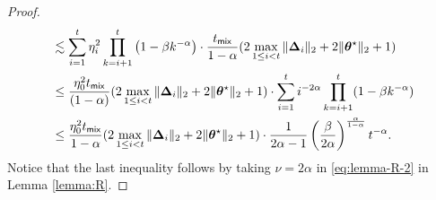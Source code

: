 \begin{proof}
\begin{align}
&\lesssim \sum_{i=1}^t \eta_i^2 \prod_{k=i+1}^t \left(1-\beta k^{-\alpha} \right) \cdot  \frac{t_{\mathsf{mix}}}{1-\alpha} (2\max_{1 \leq i < t} \|\bm{\Delta}_i\|_2 + 2\|\bm{\theta}^\star\|_2  + 1)\nonumber \\ 
&\leq \frac{\eta_0^2t_{\mathsf{mix}}}{(1-\alpha)} (2\max_{1 \leq i < t} \|\bm{\Delta}_i\|_2 + 2\|\bm{\theta}^\star\|_2  + 1) \cdot \sum_{i=1}^t i^{-2\alpha} \prod_{k=i+1}^t (1-\beta k^{-\alpha})\nonumber \\
&\leq \frac{\eta_0^2t_{\mathsf{mix}}}{1-\alpha} (2\max_{1 \leq i < t} \|\bm{\Delta}_i\|_2 + 2\|\bm{\theta}^\star\|_2  + 1) \cdot \frac{1}{2\alpha-1}\left(\frac{\beta}{2\alpha}\right)^{\frac{\alpha}{1-\alpha}}t^{-\alpha}.
\end{align}
Notice that the last inequality follows by taking $\nu = 2\alpha$ in \eqref{eq:lemma-R-2} in Lemma \ref{lemma:R}. %


\end{proof}
